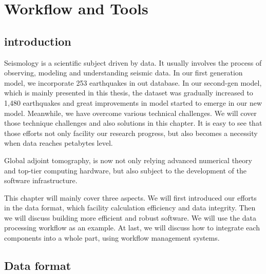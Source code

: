 \chapter{Workflow and Tools}
\label{ch:tools}

\section{introduction}

Seismology is a scientific subject driven by data. It usually involves the process
of observing, modeling and understanding seismic data. In our first generation
model, we incorporate 253 earthquakes in out database. In our second-gen
model, which is mainly presented in this thesis, the dataset was gradually
increased to 1,480 earthquakes and great improvements in model started to
emerge in our new model. Meanwhile, we have overcome various technical
challenges. We will cover those technique challenges and also solutions
in this chapter. It is easy to see that those efforts not only facility
our research progress, but also becomes a necessity when data reaches
petabytes level.

Global adjoint tomography, is now not only relying advanced
numerical theory and top-tier computing hardware, but also subject to 
the development of the software infrastructure.

This chapter will mainly cover three aspects. We will first introduced
our efforts in the data format, which facility calculation efficiency
and data integrity. Then we will discuss building more efficient
and robust software. We will use the data processing workflow as an
example. At last, we will discuss how to integrate each components
into a whole part, using workflow management systems.


\section{Data format}

